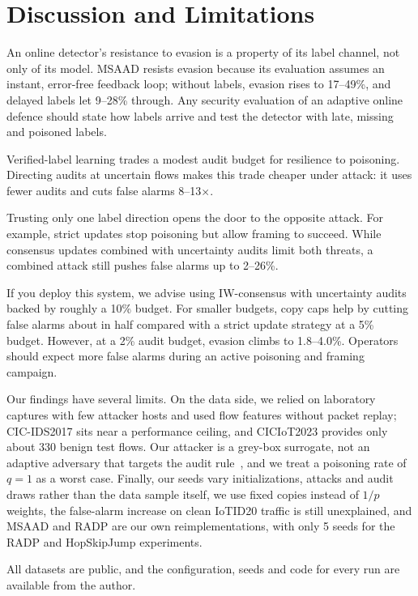 \documentclass[conference]{IEEEtran}
\begin{document}
\section{Discussion and Limitations}\label{sec:discussion}

An online detector's resistance to evasion is a property of its label channel,
not only of its model. MSAAD resists evasion because its evaluation assumes an
instant, error-free feedback loop; without labels, evasion rises to 17--49\%,
and delayed labels let 9--28\% through. Any security evaluation of an adaptive
online defence should state how labels arrive and test the detector with late,
missing and poisoned labels.

Verified-label learning trades a modest audit budget for resilience to
poisoning. Directing audits at uncertain flows makes this trade cheaper under
attack: it uses fewer audits and cuts false alarms 8--13$\times$.

Trusting only one label direction opens the door to the opposite attack. For
example, strict updates stop poisoning but allow framing to succeed. While
consensus updates combined with uncertainty audits limit both threats, a
combined attack still pushes false alarms up to 2--26\%.

If you deploy this system, we advise using IW-consensus with uncertainty audits
backed by roughly a 10\% budget. For smaller budgets, copy caps help by cutting
false alarms about in half compared with a strict update strategy at a 5\%
budget. However, at a 2\% audit budget, evasion climbs to 1.8--4.0\%. Operators
should expect more false alarms during an active poisoning and framing
campaign.

Our findings have several limits. On the data side, we relied on laboratory
captures with few attacker hosts and used flow features without packet replay;
CIC-IDS2017 sits near a performance ceiling, and CICIoT2023 provides only about
330 benign test flows. Our attacker is a grey-box surrogate, not an adaptive
adversary that targets the audit rule~\cite{zhi2025ala}, and we treat a
poisoning rate of $q = 1$ as a worst case. Finally, our seeds vary
initializations, attacks and audit draws rather than the data sample itself, we
use fixed copies instead of $1/p$ weights, the false-alarm increase on clean
IoTID20 traffic is still unexplained, and MSAAD and RADP are our own
reimplementations, with only 5 seeds for the RADP and HopSkipJump experiments.

All datasets are public, and the configuration, seeds and code for every run
are available from the author.
\end{document}
